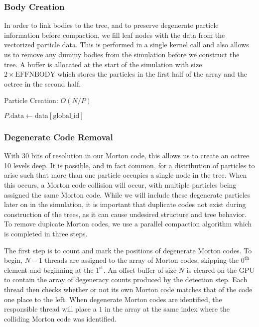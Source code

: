 \documentclass{thesis}
\begin{document}
\subsubsection{Body Creation}
In order to link bodies to the tree, and to preserve degenerate particle information before compaction, we fill leaf nodes with the data from the vectorized particle data. This is performed in a single kernel call and also allows us to remove any dummy bodies from the simulation before we construct the tree. A buffer is allocated at the start of the simulation with size $2 \times \text{EFFNBODY}$ which stores the particles in the first half of the array and the octree in the second half.
\begin{algorithm}
    \label{alg:ParticleCreation}
    \caption{Particle Creation: $O(N/P)$}
    \begin{algorithmic}
            \State $P.\text{data} \gets \text{data}[\text{global\_id}]$
        \EndFor
    \end{algorithmic}
\end{algorithm}

\subsubsection{Degenerate Code Removal}
With 30 bits of resolution in our  Morton code, this allows us to create an octree 10 levels deep. It is possible, and in fact common, for a distribution of particles to arise such that more than one particle occupies a single node in the tree. When this occurs, a Morton code collision will occur, with multiple particles being assigned the same  Morton code. While we will include these degenerate particles later on in the simulation, it is important that duplicate codes not exist during construction of the trees, as it can cause undesired structure and tree behavior. To remove dupicate Morton codes, we use a parallel compaction algorithm which is completed in three steps.

The first step is to count and mark the positions of degenerate  Morton codes. To begin, $N - 1$ threads are assigned to the array of Morton codes, skipping the $\text{0}^\text{th}$ element and beginning at the $\text{1}^\text{st}$. An offset buffer of size $N$ is cleared on the GPU to contain the array of degeneracy counts produced by the detection step. Each thread then checks whether or not its own Morton code matches that of the code one place to the left. When degenerate  Morton codes are identified, the responsible thread will place a $1$ in the array at the same index where the colliding Morton code was identified.
\end{document}

